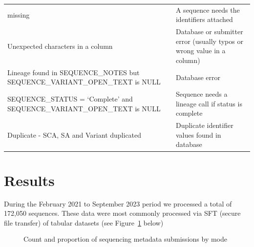 \documentclass[
  letterpaper,
  DIV=11,
  numbers=noendperiod]{scrartcl}
\begin{document}
\begin{longtable}[]{@{}
  >{\raggedright\arraybackslash}p{}
  >{\raggedright\arraybackslash}p{}@{}}
missing & A sequence needs the identifiers attached \\
Unexpected characters in a column & Database or submitter error (usually
typos or wrong value in a column) \\
Lineage found in SEQUENCE\_NOTES but SEQUENCE\_VARIANT\_OPEN\_TEXT is
NULL & Database error \\
SEQUENCE\_STATUS = `Complete' and SEQUENCE\_VARIANT\_OPEN\_TEXT is NULL
& Sequence needs a lineage call if status is complete \\
Duplicate - SCA, SA and Variant duplicated & Duplicate identifier values
found in database \\
\end{longtable}

\section{Results}\label{results}

During the February 2021 to September 2023 period we processed a total
of 172,050 sequences. These data were most commonly processed via SFT
(secure file transfer) of tabular datasets (see
Figure~\ref{fig-countprop} below)

\begin{figure}[H]


\caption{\label{fig-countprop}Count and proportion of sequencing
metadata submissions by mode}

\end{figure}%
\end{document}
